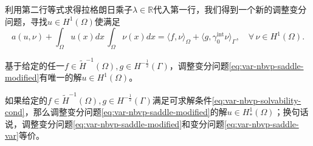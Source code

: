 利用第二行等式求得拉格朗日乘子$\lambda \in \mathbb{R}$代入第一行，我们得到一个新的调整变分问题，寻找$u \in H^{1}(\Omega)$使满足
\begin{equation}
  \label{eq:var-nbvp-saddle-modified}
  a(u,\nu) + \int_{\Omega}  u(x)  dx \, \int_{\Omega} \nu(x) dx =
  \langle f,\nu \rangle_{\Omega} +
  \langle g, \gamma_{0}^{\text{int}} \nu \rangle_{\Gamma}, \quad \forall \, \nu \in H^{1}(\Omega).
\end{equation}

\begin{theorem}[诺依曼边界值的调整变分问题解]
  \label{theorem:var-nbvp-saddle-modified-solution}
  基于给定的任一$f \in \widetilde{H}^{-1}(\Omega), g \in H^{-\frac{1}{2}}(\Gamma)$，调整变分问题\eqref{eq:var-nbvp-saddle-modified}有唯一的解$u \in H^{1}(\Omega)$。

  如果给定的$f \in \widetilde{H}^{-1}(\Omega), g \in H^{-\frac{1}{2}}(\Gamma)$满足可求解条件\eqref{eq:var-nbvp-solvability-cond}，那么调整变分问题\eqref{eq:var-nbvp-saddle-modified}的解$u \in H_{*}^{1}(\Omega)$；换句话说，调整变分问题\eqref{eq:var-nbvp-saddle-modified}和变分问题\eqref{eq:var-nbvp-saddle-var}等价。
\end{theorem}

